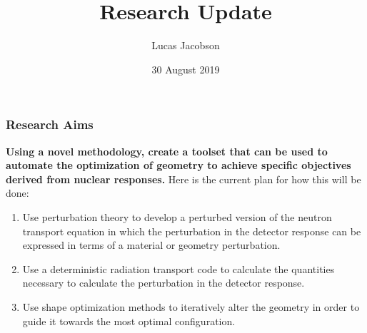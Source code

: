 \documentclass[t]{beamer}
\title{Research Update}
\author{Lucas Jacobson}
\institute{University of Wisconsin--Madison}
\date{30 August 2019}
\begin{document}

\begin{frame}
  \titlepage
\end{frame}


\begin{frame}
  \frametitle{Research Aims}
  \textbf{Using a novel methodology, create a toolset that can be used to
  automate the optimization of geometry to achieve specific objectives derived
  from nuclear responses.}
  \newline\newline
  Here is the current plan for how this will be done:
  \begin{enumerate}[1]
    \item Use perturbation theory to develop a perturbed version of the neutron
          transport equation in which the perturbation in the detector response
          can be expressed in terms of a material or geometry perturbation.
    \item Use a deterministic radiation transport code to calculate the
          quantities necessary to calculate the perturbation in the detector
          response.
    \item Use shape optimization methods to iteratively alter the geometry in
          order to guide it towards the most optimal configuration.
  \end{enumerate}
\end{frame}

\end{document}
